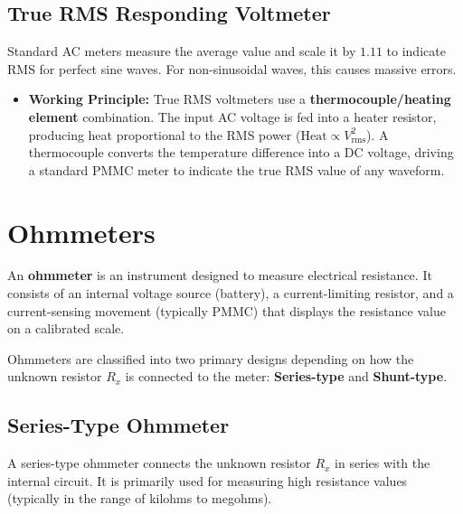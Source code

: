 \documentclass[12pt,a4paper]{article}
\begin{document}
\subsection{True RMS Responding Voltmeter}
Standard AC meters measure the average value and scale it by $1.11$ to indicate RMS for perfect sine waves. For non-sinusoidal waves, this causes massive errors.

\begin{itemize}[leftmargin=*, itemsep=3.5pt]
  \item \textbf{Working Principle:} True RMS voltmeters use a \textbf{thermocouple/heating element} combination. The input AC voltage is fed into a heater resistor, producing heat proportional to the RMS power ($\text{Heat} \propto V_{\text{rms}}^2$). A thermocouple converts the temperature difference into a DC voltage, driving a standard PMMC meter to indicate the true RMS value of any waveform.
\end{itemize}

\section{Ohmmeters}

\begin{tcolorbox}[defbox, title={\textbf{Ohmmeter}}]
An \textbf{ohmmeter} is an instrument designed to measure electrical resistance. It consists of an internal voltage source (battery), a current-limiting resistor, and a current-sensing movement (typically PMMC) that displays the resistance value on a calibrated scale.
\end{tcolorbox}

Ohmmeters are classified into two primary designs depending on how the unknown resistor $R_x$ is connected to the meter: \textbf{Series-type} and \textbf{Shunt-type}.

\subsection{Series-Type Ohmmeter}
A series-type ohmmeter connects the unknown resistor $R_x$ in series with the internal circuit. It is primarily used for measuring high resistance values (typically in the range of kilohms to megohms).
\end{document}
